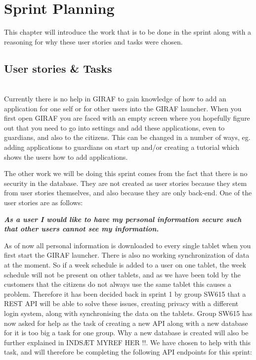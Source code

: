 \chapter{Sprint Planning}
This chapter will introduce the work that is to be done in the sprint along with a reasoning for why these user stories and tasks were chosen.

\section{User stories \& Tasks}
\begin{description}[style=unboxed]
    \item[{[}\phigh{]} As a guardian I would like the launcher to tell me how to add applications if none are active, such that it is easier to add applications for beginners.] \hfill \\ 
    Currently there is no help in GIRAF to gain knowledge of how to add an application for one self or for other users into the GIRAF launcher.
    When you first open GIRAF you are faced with an empty screen where you hopefully figure out that you need to go into settings and add these applications, even to guardians, and also to the citizens.
    This can be changed in a number of ways, eg. adding applications to guardians on start up and/or creating a tutorial which shows the users how to add applications.
\end{description}
The other work we will be doing this sprint comes from the fact that there is no security in the database.
They are not created as user stories because they stem from user stories themselves, and also because they are only back-end.
One of the user stories are as follows:

\textbf{\textit{As a user I would like to have my personal information secure such that other users cannot see my information.}}

As of now all personal information is downloaded to every single tablet when you first start the GIRAF launcher.
There is also no working synchronization of data at the moment. 
So if a week schedule is added to a user on one tablet, the week schedule will not be present on other tablets, and as we have been told by the customers that the citizens do not always use the same tablet this causes a problem.
Therefore it has been decided back in sprint 1 by group SW615 that a REST API will be able to solve these issues, creating privacy with a different login system, along with synchronising the data on the tablets.
Group SW615 has now asked for help as the task of creating a new API along with a new database for it is too big a task for one group.
Why a new database is created will also be further explained in INDSÆT MYREF HER !!.
We have chosen to help with this task, and will therefore be completing the following API endpoints for this sprint: 


